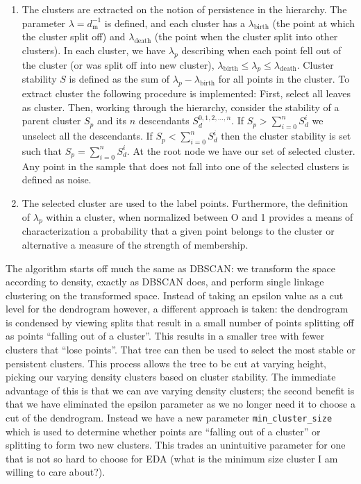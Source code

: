 \documentclass[fleqn,usenatbib]{mnras}
\begin{document}
\begin{enumerate}
\item The clusters are extracted on the notion of persistence in the hierarchy.
  The parameter $\lambda = d_{\mathrm{m}}^{-1}$ is defined, and each cluster has a
  $\lambda_{\mathrm{birth}}$ (the point at which the cluster split off) and
  $\lambda_{\mathrm{death}}$ (the point when the cluster split into other clusters).
  In each cluster, we have $\lambda_p$ describing when each point fell out of the
  cluster (or was split off into new cluster), $\lambda_{\mathrm{birth}} \leq \lambda_{p} \leq \lambda_{\mathrm{death}}$.
  Cluster stability  $S$ is defined as the sum of $\lambda_{p} - \lambda_{\mathrm{birth}}$
  for all points in the cluster. To extract cluster the following procedure is
  implemented: First, select all leaves as cluster. Then, working through the
  hierarchy, consider the stability of a parent cluster $S_p$ and its $n$ descendants
  $S_d^{0,1,2,...,n}$. If $S_p > \sum_{i=0}^{n} S_d^i$ we unselect all the descendants.
  If $S_p < \sum_{i=0}^{n} S_d^i$ then the cluster stability is set such that
  $S_p = \sum_{i=0}^{n} S_d^i$. At the root node we have our set of selected 
  cluster. Any point in the sample that does not fall into one of the selected
  clusters is defined as noise.

\item The selected cluster are used to the label points. Furthermore, the definition
  of $\lambda_p$ within a cluster, when normalized between O and 1 provides a means
  of characterization a probability that a given point belongs to the cluster or
  alternative a measure of the strength of membership. 
  
\end{enumerate}

The algorithm starts off much the same as DBSCAN: we transform the space
according to density, exactly as DBSCAN does, and perform single linkage
clustering on the transformed space. Instead of taking an epsilon value
as a cut level for the dendrogram however, a different approach is taken:
the dendrogram is condensed by viewing splits that result in a small number
of points splitting off as points ``falling out of a cluster''. This results
in a smaller tree with fewer clusters that ``lose points''. That tree can then
be used to select the most stable or persistent clusters. This process allows
the tree to be cut at varying height, picking our varying density clusters
based on cluster stability. The immediate advantage of this is that we can
ave varying density clusters; the second benefit is that we have eliminated
the epsilon parameter as we no longer need it to choose a cut of the dendrogram.
Instead we have a new parameter \texttt{min\_cluster\_size} which is used
to determine whether points are ``falling out of a cluster'' or splitting
to form two new clusters. This trades an unintuitive parameter for one that
is not so hard to choose for EDA (what is the minimum size cluster I am
willing to care about?).
\end{document}
